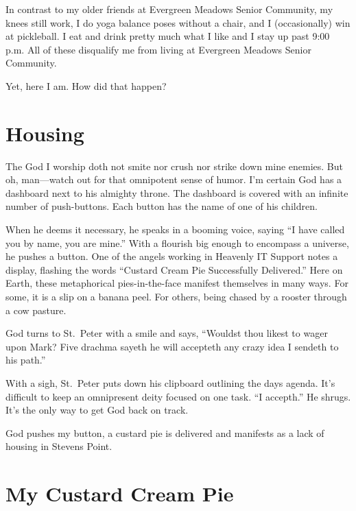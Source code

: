 \documentclass[
  letterpaper,
  DIV=11,
  numbers=noendperiod]{scrreprt}
\begin{document}
In contrast to my older friends at Evergreen Meadows Senior Community,
my knees still work, I do yoga balance poses without a chair, and I
(occasionally) win at pickleball. I eat and drink pretty much what I
like and I stay up past 9:00 p.m. All of these disqualify me from living
at Evergreen Meadows Senior Community.

Yet, here I am. How did that happen?

\section*{\texorpdfstring{\textbf{Housing}}{Housing}}\label{housing}


The God I worship doth not smite nor crush nor strike down mine enemies.
But oh, man---watch out for that omnipotent sense of humor. I'm certain
God has a dashboard next to his almighty throne. The dashboard is
covered with an infinite number of push-buttons. Each button has the
name of one of his children.

When he deems it necessary, he speaks in a booming voice, saying ``I
have called you by name, you are mine.'' With a flourish big enough to
encompass a universe, he pushes a button. One of the angels working in
Heavenly IT Support notes a display, flashing the words ``Custard Cream
Pie Successfully Delivered.'' Here on Earth, these metaphorical
pies-in-the-face manifest themselves in many ways. For some, it is a
slip on a banana peel. For others, being chased by a rooster through a
cow pasture.

God turns to St.~Peter with a smile and says, ``Wouldst thou likest to
wager upon Mark? Five drachma sayeth he will accepteth any crazy idea I
sendeth to his path.''

With a sigh, St.~Peter puts down his clipboard outlining the days
agenda. It's difficult to keep an omnipresent deity focused on one task.
``I accepth.'' He shrugs. It's the only way to get God back on track.

God pushes my button, a custard pie is delivered and manifests as a lack
of housing in Stevens Point.

\section*{My Custard Cream Pie}\label{my-custard-cream-pie}
\end{document}

